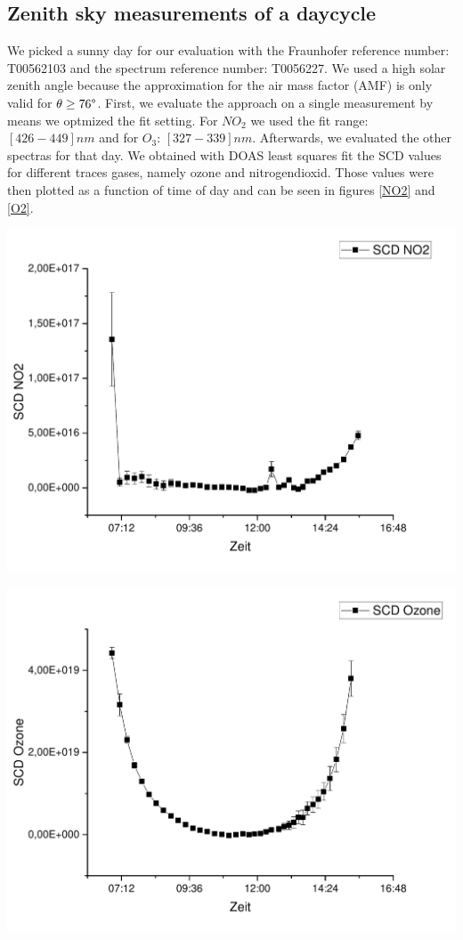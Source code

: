 \documentclass[12pt, english]{scrartcl} %
\newenvironment{Figure}
  {\par\medskip\noindent\minipage{\linewidth}}
  {\endminipage\par\medskip}
\begin{document}
\begin{multicols}{2}
\subsection{Zenith sky measurements of a daycycle}
We picked a sunny day for our evaluation with the Fraunhofer reference number: T00562103 and the spectrum reference number: T0056227. We used a high solar zenith angle because the approximation for the air mass factor (AMF) is only valid for $\theta \geq 76 \degree$. First, we evaluate the approach on a single measurement by means we optmized the fit setting. For $NO_2$ we used the fit range: $[426-449] nm$ and for $O_3$: $[327-339] nm$. Afterwards, we evaluated the other spectras for that day.
We obtained with DOAS least squares fit the SCD values for different traces gases, namely ozone and nitrogendioxid. Those values were then plotted as a function of time of day and can be seen in figures \ref{NO2} and \ref{O2}.
\begin{Figure}
 \centering
 \captionsetup{format=plain}
 \includegraphics[width=\linewidth]{graphics/SCDNO2.pdf}
 \label{NO2}
\end{Figure}
\begin{Figure}
 \centering
 \captionsetup{format=plain}
 \includegraphics[width=\linewidth]{graphics/SCDOzone2.pdf}

\end{Figure}
\end{multicols}
\end{document}

